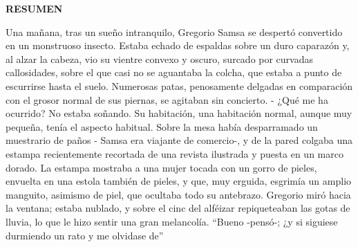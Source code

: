 
\begin{center}
{\LARGE \bfseries RESUMEN}

\vspace{2.5cm}
\end{center}


Una mañana, tras un sueño intranquilo, Gregorio Samsa se despertó convertido en
un monstruoso insecto. Estaba echado de espaldas sobre un duro caparazón y, al
alzar la cabeza, vio su vientre convexo y oscuro, surcado por curvadas
callosidades, sobre el que casi no se aguantaba la colcha, que estaba a punto de
escurrirse hasta el suelo. Numerosas patas, penosamente delgadas en comparación
con el grosor normal de sus piernas, se agitaban sin concierto. - ¿Qué me ha
ocurrido? No estaba soñando. Su habitación, una habitación normal, aunque muy
pequeña, tenía el aspecto habitual. Sobre la mesa había desparramado un
muestrario de paños - Samsa era viajante de comercio-, y de la pared colgaba una
estampa recientemente recortada de una revista ilustrada y puesta en un marco
dorado. La estampa mostraba a una mujer tocada con un gorro de pieles, envuelta
en una estola también de pieles, y que, muy erguida, esgrimía un amplio
manguito, asimismo de piel, que ocultaba todo su antebrazo. Gregorio miró hacia
la ventana; estaba nublado, y sobre el cinc del alféizar repiqueteaban las gotas
de lluvia, lo que le hizo sentir una gran melancolía. ``Bueno -pensó-; ¿y si
siguiese durmiendo un rato y me olvidase de''
